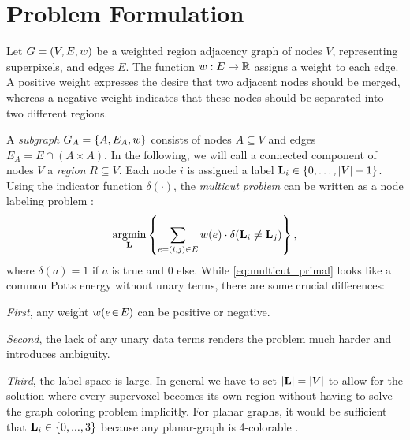 \section{Problem Formulation\label{sec:problem_formulation}}
Let $G=(V,E, w)$ be a weighted region adjacency graph of
nodes $V$, representing superpixels,
and edges $E$.
The function $w : E \rightarrow \mathbb{R}$ assigns a weight to each edge.
A positive weight expresses the desire that two adjacent nodes should
be merged, whereas a negative weight indicates
that these nodes should be separated into two different regions.

A \emph{subgraph} $G_A = \{A, E_A, w\}$ consists
of nodes $A \subseteq V$ and edges $E_A = E\cap (A\times A)$.
%
In the following, we will call a connected component
of nodes $V$ a \emph{region} $R \subseteq V$.
%
Each node $i$ is assigned a 
label $\mathbf{L}_{i} \in \{0, \dots, | V |-1\}$. Using the indicator 
function
$\delta(\cdot)$, the
\emph{multicut problem} can be written as a node labeling problem
\cite{bagon_2011_arxiv}:
%
\begin{align}
\operatorname*{\arg\!\min}_{\mathbf{L}}
    \left\{
    \sum_{ e=(i,j) \in E}
        w(e)
        \cdot \delta( \mathbf{L}_i \neq \mathbf{L}_j )
    \right\},
    \label{eq:multicut_primal}
\end{align}
%
where $\delta(a) = 1$ if $a$ is true and $0$ else.
%
While \eqref{eq:multicut_primal} looks like a common Potts energy without
unary terms, there are some crucial differences:

\noindent
\emph{First}, any weight $w(e\!\in\!E)$ can be positive or negative.

\noindent
\emph{Second}, the lack of any unary data terms renders the problem much harder
and introduces ambiguity.

\noindent
\emph{Third}, the label space is large.
In general we have to set
$|\mathbf{L}| = |V|$ to allow for the solution
where every supervoxel becomes its own region
without having to solve the graph coloring problem implicitly.
For planar graphs, it would be sufficient that $\mathbf{L}_i \in \{0,...,3\}$
because any planar-graph is 4-colorable \cite{appel_1977_4color}.
%


